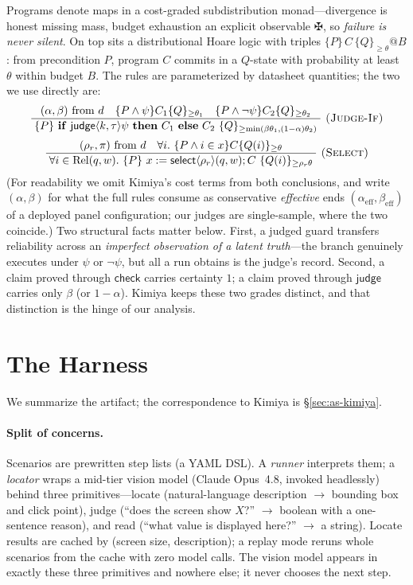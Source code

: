 \documentclass[acmsmall,screen,nonacm]{acmart}
\newcommand{\checkk}{\mathsf{check}}
\newcommand{\judge}{\mathsf{judge}}
\newcommand{\select}{\mathsf{select}}
\newcommand{\conf}{\theta}
\newcommand{\budget}{B}
\newcommand{\bolt}{\maltese}
\newcommand{\ir}[3]{\dfrac{\;#2\;}{\;#3\;}\ \textsc{(#1)}}
\theoremstyle{acmdefinition}%
\theoremstyle{acmplain}%
\begin{document}
Programs denote maps in a cost-graded subdistribution monad---divergence
is honest missing mass, budget exhaustion an explicit observable
$\bolt$, so \emph{failure is never silent}. On top sits a distributional
Hoare logic with triples $\{P\}\,C\,\{Q\}_{\ge\conf}@\budget$: from
precondition $P$, program $C$ commits in a $Q$-state with probability at
least $\conf$ within budget $\budget$. The rules are parameterized by
datasheet quantities; the two we use directly are:
\[
\ir{Judge-If}{
(\alpha,\beta)\ \text{from }d\quad
\{P\wedge\psi\}C_1\{Q\}_{\ge\conf_1}\quad
\{P\wedge\neg\psi\}C_2\{Q\}_{\ge\conf_2}
}{
\{P\}\ \mathbf{if}\ \judge\langle k,\tau\rangle\psi\ \mathbf{then}\ C_1\
\mathbf{else}\ C_2\ \{Q\}_{\ge\min(\beta\conf_1,(1-\alpha)\conf_2)}
}
\]
\[
\ir{Select}{
(\rho_r,\pi)\ \text{from }d\quad \forall i.\ \{P\wedge i\in x\}C\{Q(i)\}_{\ge\conf}
}{
\forall i\in\mathrm{Rel}(q,w).\ \{P\}\ x:=\select\langle\rho_r\rangle(q,w);C\
\{Q(i)\}_{\ge\rho_r\conf}
}
\]
(For readability we omit Kimiya's cost terms from both conclusions, and
write $(\alpha,\beta)$ for what the full rules consume as conservative
\emph{effective} ends $(\alpha_{\mathrm{eff}},\beta_{\mathrm{eff}})$ of a
deployed panel configuration; our judges are single-sample, where the two
coincide.) Two structural facts matter below. First, a judged guard transfers
reliability across an \emph{imperfect observation of a latent
truth}---the branch genuinely executes under $\psi$ or $\neg\psi$, but all
a run obtains is the judge's record. Second, a claim proved through
$\checkk$ carries certainty $1$; a claim proved through $\judge$ carries
only $\beta$ (or $1-\alpha$). Kimiya keeps these two grades distinct, and
that distinction is the hinge of our analysis.

\section{The Harness}
\label{sec:harness}

We summarize the artifact; the correspondence to Kimiya is \S\ref{sec:as-kimiya}.

\paragraph{Split of concerns.} Scenarios are prewritten step lists (a YAML
DSL). A \emph{runner} interprets them; a \emph{locator} wraps a
mid-tier vision model (Claude Opus~4.8, invoked headlessly) behind three
primitives---\textsf{locate} (natural-language description
$\to$ bounding box and click point), \textsf{judge} (``does the screen
show $X$?'' $\to$ boolean with a one-sentence reason), and \textsf{read}
(``what value is displayed here?'' $\to$ a string). Locate results are
cached by (screen size, description); a replay mode reruns whole
scenarios from the cache with zero model calls. The vision model appears
in exactly these three primitives and nowhere else; it never chooses the
next step.
\end{document}
